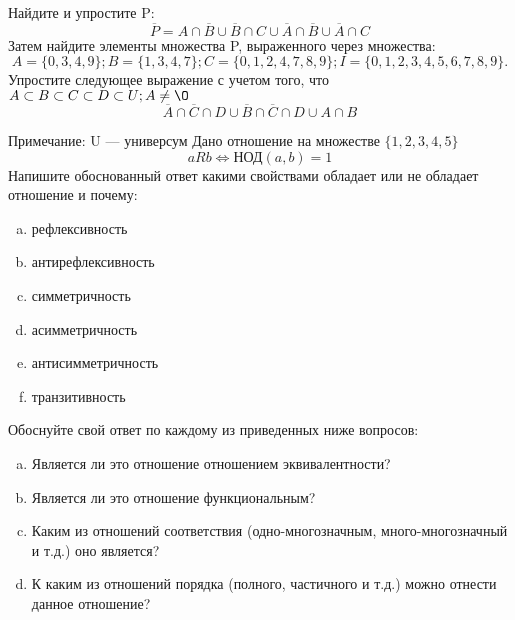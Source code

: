 \documentclass[10pt]{exam}
\begin{document}
\begin{questions}
\question
Найдите и упростите P:
\begin{equation*}
\overline{P} = A \cap \overline{B} \cup \overline{B} \cap C \cup \overline{A} \cap \overline{B} \cup \overline{A} \cap C
\end{equation*}
Затем найдите элементы множества P, выраженного через множества:
\begin{equation*}
A = \{0, 3, 4, 9\}; 
B = \{1, 3, 4, 7\};
C = \{0, 1, 2, 4, 7, 8, 9\};
I = \{0, 1, 2, 3, 4, 5, 6, 7, 8, 9\}.
\end{equation*}\question
Упростите следующее выражение с учетом того, что $A\subset B \subset C \subset D \subset U; A \neq \O$
\begin{equation*}
\overline{A} \cap \overline{C} \cap D \cup \overline{B} \cap \overline{C} \cap D \cup A \cap B
\end{equation*}

Примечание: U — универсум\question
Дано отношение на множестве $\{1, 2, 3, 4, 5\}$ 
\begin{equation*}
aRb \iff  \text{НОД}(a,b) =1
\end{equation*}
Напишите обоснованный ответ какими свойствами обладает или не обладает отношение и почему:   
\begin{enumerate} [a)]\setcounter{enumi}{0}
\item рефлексивность
\item антирефлексивность
\item симметричность
\item асимметричность
\item антисимметричность
\item транзитивность
\end{enumerate}

Обоснуйте свой ответ по каждому из приведенных ниже вопросов:
\begin{enumerate} [a)]\setcounter{enumi}{0}
    \item Является ли это отношение отношением эквивалентности?
    \item Является ли это отношение функциональным?
    \item Каким из отношений соответствия (одно-многозначным, много-многозначный и т.д.) оно является?
    \item К каким из отношений порядка (полного, частичного и т.д.) можно отнести данное отношение?
\end{enumerate}



\end{questions}
\end{document}
